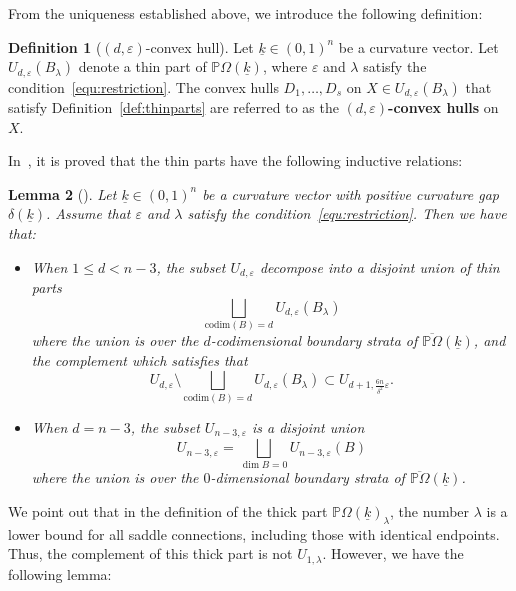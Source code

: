 \documentclass{compositio}
\numberwithin{equation}{section}
\numberwithin{figure}{section}
\theoremstyle{definition}
\newtheorem{definition}{Definition}[section]
\theoremstyle{plain}
\newtheorem{lemma}[definition]{Lemma}
\begin{document}
{From the uniqueness established above, we introduce the following definition:
\begin{definition}[$(d,\varepsilon)$-convex hull]
Let $\underline{k}\in(0,1)^n$ be a curvature vector. Let $U_{d,\varepsilon}(B_{\lambda})$ denote a thin part of $\mathbb{P}\Omega(\underline{k})$, where $\varepsilon$ and $\lambda$ satisfy the condition~\eqref{equ:restriction}. The convex hulls $D_1, \ldots, D_s$ on $X \in U_{d,\varepsilon}(B_{\lambda})$ that satisfy Definition~\ref{def:thinparts} are referred to as the \textbf{$(d,\varepsilon)$-convex hulls} on $X$.
\end{definition}

In~\cite{fu2024uniformlengthestimatestrajectories}, it is proved that the thin parts have the following inductive relations:
\begin{lemma}[{\cite[Theorem~5.12]{fu2024uniformlengthestimatestrajectories}}]\label{lem:epsilondecomp}
    Let $\underline{k}\in(0,1)^n$ be a curvature vector with positive curvature gap $\delta(\underline k)$. Assume that $\varepsilon$ and $\lambda$ satisfy the condition~\eqref{equ:restriction}.  Then we have that: 
    \begin{itemize}
        \item When $1\le d < n-3$, the subset $U_{d,\varepsilon}$ decompose into a disjoint union of thin parts
        $$\underset{\mathrm{codim}(B)=d}{\bigsqcup} U_{d,\varepsilon}(B_\lambda)$$
        where the union is over the $d$-codimensional boundary strata of $\overline{\mathbb{P}\Omega}(\underline{k})$,
        and the complement which satisfies that
        $$U_{d,\varepsilon}\setminus \underset{\mathrm{codim}(B)=d}{\bigsqcup} U_{d,\varepsilon}(B_\lambda) 
        \subset
        U_{d + 1, \frac{6n}{\delta^2}\varepsilon}.$$
        \item When $d = n-3$, the subset $U_{n-3,\varepsilon}$ is a disjoint union
        $$U_{n-3,\varepsilon}=\underset{\dim B = 0}{\bigsqcup}U_{n-3,\varepsilon}(B)$$
        where the union is over the $0$-dimensional boundary strata of $\overline{\mathbb{P}\Omega}(\underline{k})$.
    \end{itemize}
\end{lemma}

We point out that in the definition of the thick part $\mathbb{P}\Omega(\underline{k})_{\lambda}$, the number $\lambda$ is a lower bound for all saddle connections, including those with identical endpoints. Thus, the complement of this thick part is not $U_{1,\lambda}$. However, we have the following lemma:

}
\end{document}
